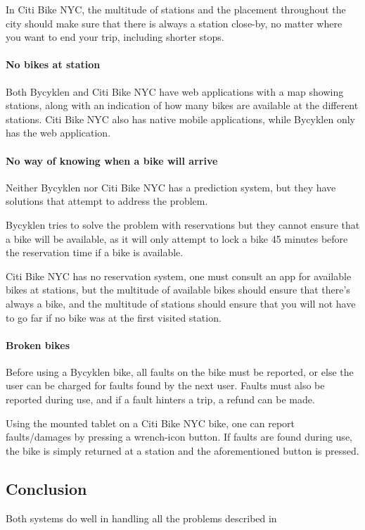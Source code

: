 In Citi Bike NYC, the multitude of stations and the placement throughout the city should make sure that there is always a station close-by, no matter where you want to end your trip, including shorter stops.

\paragraph{No bikes at station}
Both Bycyklen and Citi Bike NYC have web applications with a map showing stations, along with an indication of how many bikes are available at the different stations.
Citi Bike NYC also has native mobile applications, while Bycyklen only has the web application.

\paragraph{No way of knowing when a bike will arrive}
Neither Bycyklen nor Citi Bike NYC has a prediction system, but they have solutions that attempt to address the problem.

Bycyklen tries to solve the problem with reservations but they cannot ensure that a bike will be available, as it will only attempt to lock a bike 45 minutes before the reservation time if a bike is available.

Citi Bike NYC has no reservation system, one must consult an app for available bikes at stations, but the multitude of  available bikes should ensure that there's always a bike, and the multitude of stations should ensure that you will not have to go far if no bike was at the first visited station.

\paragraph{Broken bikes}
Before using a Bycyklen bike, all faults on the bike must be reported, or else the user can be charged for faults found by the next user.
Faults must also be reported during use, and if a fault hinters a trip, a refund can be made.

Using the mounted tablet on a Citi Bike NYC bike, one can report faults/damages by pressing a wrench-icon button.
If faults are found during use, the bike is simply returned at a station and the aforementioned button is pressed.

\subsection{Conclusion}
Both systems do well in handling all the problems described in 

